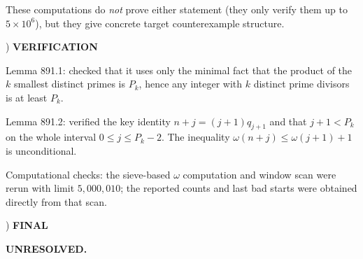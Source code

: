\noindent These computations do \emph{not} prove either statement (they only verify them up to $5\times 10^6$), but they give concrete target counterexample structure.

) \textbf{VERIFICATION}

\noindent Lemma 891.1: checked that it uses only the minimal fact that the product of the $k$ smallest distinct primes is $P_k$, hence any integer with $k$ distinct prime divisors is at least $P_k$.

\noindent Lemma 891.2: verified the key identity $n+j = (j+1)q_{j+1}$ and that $j+1<P_k$ on the whole interval $0\le j\le P_k-2$. The inequality $\omega(n+j)\le \omega(j+1)+1$ is unconditional.

\noindent Computational checks: the sieve-based $\omega$ computation and window scan were rerun with limit $5{,}000{,}010$; the reported counts and last bad starts were obtained directly from that scan.

) \textbf{FINAL}

\noindent \textbf{UNRESOLVED.}

